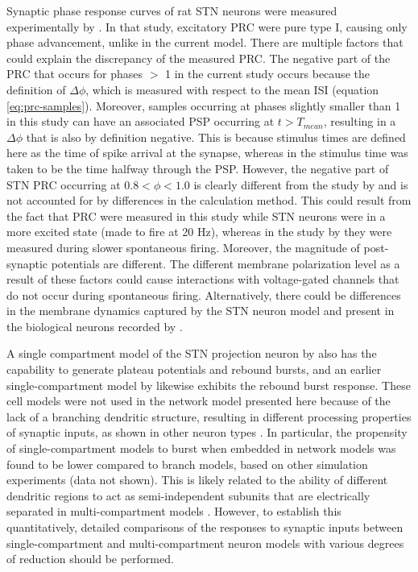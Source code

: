 %
%
%
%
%
%
%
Synaptic phase response curves of rat STN neurons were measured experimentally
by \cite{farries_phase_2012}. In that study, excitatory PRC were pure type I,
causing only phase advancement, unlike in the current model. There are multiple factors
that could explain the discrepancy of the measured PRC. The negative part of the
PRC that occurs for phases $>$ 1 in the current study occurs because the definition of
$\Delta \phi$, which is measured with respect to the mean ISI (equation \ref{eq:prc-samples}).
Moreover, samples occurring at phases slightly smaller than 1 in this study can have an associated
PSP occurring at $t > T_{mean}$, resulting in a $\Delta \phi$ that is also by definition negative.
This is because stimulus times are defined here as the time of spike arrival at the synapse,
whereas in \cite{farries_phase_2012} the stimulus time was taken to be the time halfway through the PSP.
However, the negative part of STN PRC occurring at $0.8 < \phi < 1.0 $ is clearly different
from the study by \cite{farries_phase_2012} and is not accounted for by differences in
the calculation method. This could result from the fact that PRC were measured in this study
while STN neurons were in a more excited state (made to fire at 20 Hz), whereas in
the study by \cite{farries_phase_2012} they were measured during slower spontaneous firing.
Moreover, the magnitude of post-synaptic potentials are different.
The different membrane polarization level as a result of these factors could cause interactions
with voltage-gated channels that do not occur during spontaneous firing.
Alternatively, there could be differences in the membrane dynamics captured by the
\cite{gillies_membrane_2005} STN neuron model and present in the biological neurons
recorded by \cite{farries_phase_2012}.

A single compartment model of the STN projection neuron by \cite{otsuka_conductance-based_2004}
also has the capability to generate plateau potentials and rebound bursts,
and an earlier single-compartment model by \cite{terman_activity_2002} likewise
exhibits the rebound burst response. These cell models were not used in the network
model presented here because of the lack of a branching dendritic structure, resulting
in different processing properties of synaptic inputs, as shown in other neuron types \cite{hendrickson_capabilities_2011,elbasiouny_development_2014}.
In particular, the propensity of single-compartment models to burst when embedded
in network models was found to be lower compared to branch models, based on
other simulation experiments (data not shown). This is likely related to
the ability of different dendritic regions to act as semi-independent subunits
that are electrically separated in multi-compartment models \cite{wybo_electrical_2019}.
However, to establish this quantitatively, detailed comparisons of the
responses to synaptic inputs between single-compartment and multi-compartment
neuron models with various degrees of reduction should be performed.

